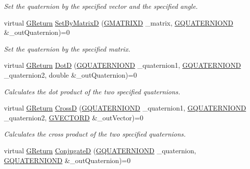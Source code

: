 \begin{DoxyCompactItemize}
\begin{DoxyCompactList}\small\item\em Set the quaternion by the specified vector and the specified angle. \end{DoxyCompactList}\item 
virtual \mbox{\hyperlink{namespaceGW_a67a839e3df7ea8a5c5686613a7a3de21}{G\+Return}} \mbox{\hyperlink{classGW_1_1MATH_1_1GQuaternion_a22539c93e600bce0d09081eeec368c9c}{Set\+By\+MatrixD}} (\mbox{\hyperlink{structGW_1_1MATH_1_1GMATRIXD}{G\+M\+A\+T\+R\+I\+XD}} \+\_\+matrix, \mbox{\hyperlink{structGW_1_1MATH_1_1GQUATERNIOND}{G\+Q\+U\+A\+T\+E\+R\+N\+I\+O\+ND}} \&\+\_\+out\+Quaternion)=0
\begin{DoxyCompactList}\small\item\em Set the quaternion by the specified matrix. \end{DoxyCompactList}\item 
virtual \mbox{\hyperlink{namespaceGW_a67a839e3df7ea8a5c5686613a7a3de21}{G\+Return}} \mbox{\hyperlink{classGW_1_1MATH_1_1GQuaternion_acffef6fd3e2d5f726428f2c09a4c6a72}{DotD}} (\mbox{\hyperlink{structGW_1_1MATH_1_1GQUATERNIOND}{G\+Q\+U\+A\+T\+E\+R\+N\+I\+O\+ND}} \+\_\+quaternion1, \mbox{\hyperlink{structGW_1_1MATH_1_1GQUATERNIOND}{G\+Q\+U\+A\+T\+E\+R\+N\+I\+O\+ND}} \+\_\+quaternion2, double \&\+\_\+out\+Quaternion)=0
\begin{DoxyCompactList}\small\item\em Calculates the dot product of the two specified quaternions. \end{DoxyCompactList}\item 
virtual \mbox{\hyperlink{namespaceGW_a67a839e3df7ea8a5c5686613a7a3de21}{G\+Return}} \mbox{\hyperlink{classGW_1_1MATH_1_1GQuaternion_a2a2d62bed9008f304a64a32baad1a1ac}{CrossD}} (\mbox{\hyperlink{structGW_1_1MATH_1_1GQUATERNIOND}{G\+Q\+U\+A\+T\+E\+R\+N\+I\+O\+ND}} \+\_\+quaternion1, \mbox{\hyperlink{structGW_1_1MATH_1_1GQUATERNIOND}{G\+Q\+U\+A\+T\+E\+R\+N\+I\+O\+ND}} \+\_\+quaternion2, \mbox{\hyperlink{structGW_1_1MATH_1_1GVECTORD}{G\+V\+E\+C\+T\+O\+RD}} \&\+\_\+out\+Vector)=0
\begin{DoxyCompactList}\small\item\em Calculates the cross product of the two specified quaternions. \end{DoxyCompactList}\item 
virtual \mbox{\hyperlink{namespaceGW_a67a839e3df7ea8a5c5686613a7a3de21}{G\+Return}} \mbox{\hyperlink{classGW_1_1MATH_1_1GQuaternion_af15dde55d52feeb62a3193353529b63c}{ConjugateD}} (\mbox{\hyperlink{structGW_1_1MATH_1_1GQUATERNIOND}{G\+Q\+U\+A\+T\+E\+R\+N\+I\+O\+ND}} \+\_\+quaternion, \mbox{\hyperlink{structGW_1_1MATH_1_1GQUATERNIOND}{G\+Q\+U\+A\+T\+E\+R\+N\+I\+O\+ND}} \&\+\_\+out\+Quaternion)=0

\end{DoxyCompactItemize}
